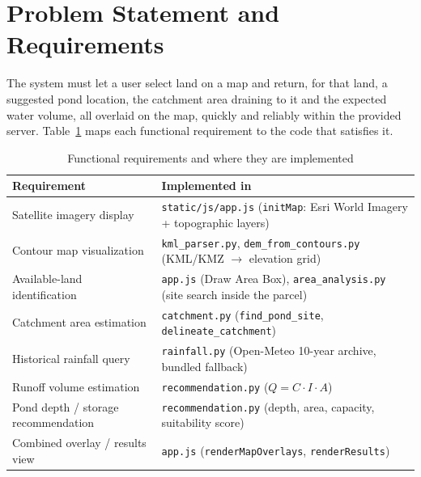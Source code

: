 \documentclass[manuscript,screen,review]{acmart}
\begin{document}
\section{Problem Statement and Requirements}
\label{sec:requirements}
The system must let a user select land on a map and return, for that land, a suggested pond location, the catchment area draining to it and the expected water volume, all overlaid on the map, quickly and reliably within the provided server. Table~\ref{tab:requirements} maps each functional requirement to the code that satisfies it.

\begin{table}[h]
  \caption{Functional requirements and where they are implemented}
  \label{tab:requirements}
  \begin{tabular}{p{3.6cm}p{9.4cm}}
    \toprule
    Requirement & Implemented in \\
    \midrule
    Satellite imagery display & \texttt{static/js/app.js} (\texttt{initMap}: Esri World Imagery + topographic layers) \\
    Contour map visualization & \texttt{kml\_parser.py}, \texttt{dem\_from\_contours.py} (KML/KMZ $\to$ elevation grid) \\
    Available-land identification & \texttt{app.js} (Draw Area Box), \texttt{area\_analysis.py} (site search inside the parcel) \\
    Catchment area estimation & \texttt{catchment.py} (\texttt{find\_pond\_site}, \texttt{delineate\_catchment}) \\
    Historical rainfall query & \texttt{rainfall.py} (Open-Meteo 10-year archive, bundled fallback) \\
    Runoff volume estimation & \texttt{recommendation.py} ($Q = C \cdot I \cdot A$) \\
    Pond depth / storage recommendation & \texttt{recommendation.py} (depth, area, capacity, suitability score) \\
    Combined overlay / results view & \texttt{app.js} (\texttt{renderMapOverlays}, \texttt{renderResults}) \\
    \bottomrule
  \end{tabular}
\end{table}
\end{document}
